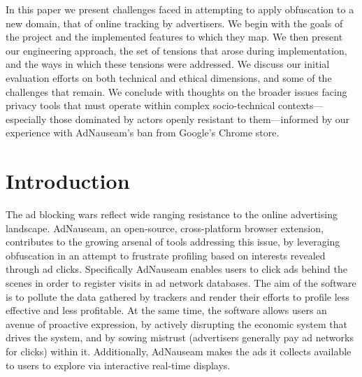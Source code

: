 \documentclass[conference]{IEEEtran}
\begin{document}
\indent In this paper we present challenges faced in attempting to apply obfuscation to a new domain, that of online tracking by advertisers. We begin with the goals of the project and the implemented features to which they map. We then present our engineering approach, the set of tensions that arose during implementation, and the ways in which these tensions were addressed. We discuss our initial evaluation efforts on both technical and ethical dimensions, and some of the challenges that remain. We conclude with thoughts on the broader issues facing privacy tools that must operate within complex socio-technical contexts---especially those dominated by actors openly resistant to them---informed by our experience with AdNauseam’s ban from Google's Chrome store.

%


\section{Introduction}

The ad blocking wars \cite{Murphy} reflect wide ranging resistance to the online advertising landscape. AdNauseam, an open-source, cross-platform browser extension, contributes to the growing arsenal of tools addressing this issue, by leveraging obfuscation in an attempt to frustrate profiling based on interests revealed through ad clicks. Specifically AdNauseam enables users to click ads behind the scenes in order to register visits in ad network databases. The aim of the software is to pollute the data gathered by trackers and  render their efforts to profile less effective and less profitable. At the same time, the software allows users an avenue of proactive expression, by actively disrupting the economic system that drives the system, and by sowing mistrust (advertisers generally pay ad networks for clicks) within it. Additionally, AdNauseam makes the ads it collects available to users to explore via interactive real-time displays.
\end{document}
